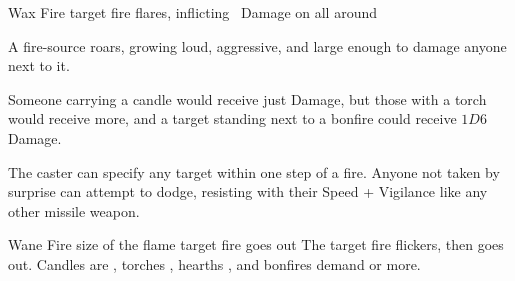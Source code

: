   {}%
  {Wax}%
  {Fire}%
  {}%
  {target fire flares, inflicting \rollConv\ Damage on all around}%
  {
    A fire-source roars, growing loud, aggressive, and large enough to damage anyone next to it.

    Someone carrying a candle would receive just  Damage, but those with a torch would receive more, and a target standing next to a bonfire could receive $1D6$ Damage.

    The caster can specify any target within one step of a fire.
    Anyone not taken by surprise can attempt to dodge, resisting with their Speed + Vigilance like any other missile weapon.
  }

  {}%
  {Wane}%
  {Fire}%
  {size of the flame}%
  {target fire goes out}%
  {
    The target fire flickers, then goes out.
    Candles are \tn[6], torches \tn[7], hearths \tn[8], and bonfires demand \tn[9] or more.
  }
